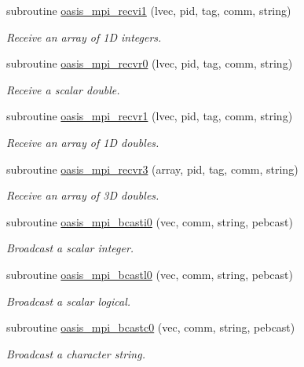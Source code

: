 \begin{DoxyCompactItemize}
subroutine \hyperlink{classmod__oasis__mpi_acf13ea626ed09fe98123f23d0990879d}{oasis\+\_\+mpi\+\_\+recvi1} (lvec, pid, tag, comm, string)
\begin{DoxyCompactList}\small\item\em Receive an array of 1\+D integers. \end{DoxyCompactList}\item 
subroutine \hyperlink{classmod__oasis__mpi_a2578d560c80d608340b5a49b327642ba}{oasis\+\_\+mpi\+\_\+recvr0} (lvec, pid, tag, comm, string)
\begin{DoxyCompactList}\small\item\em Receive a scalar double. \end{DoxyCompactList}\item 
subroutine \hyperlink{classmod__oasis__mpi_a2bbd8de453167b4c73aa09c3c44c0ca8}{oasis\+\_\+mpi\+\_\+recvr1} (lvec, pid, tag, comm, string)
\begin{DoxyCompactList}\small\item\em Receive an array of 1\+D doubles. \end{DoxyCompactList}\item 
subroutine \hyperlink{classmod__oasis__mpi_a2c3b82d2346a69cd20be3d35c5e70be6}{oasis\+\_\+mpi\+\_\+recvr3} (array, pid, tag, comm, string)
\begin{DoxyCompactList}\small\item\em Receive an array of 3\+D doubles. \end{DoxyCompactList}\item 
subroutine \hyperlink{classmod__oasis__mpi_af8bc029a22d59f1188b7f8a1a2645c40}{oasis\+\_\+mpi\+\_\+bcasti0} (vec, comm, string, pebcast)
\begin{DoxyCompactList}\small\item\em Broadcast a scalar integer. \end{DoxyCompactList}\item 
subroutine \hyperlink{classmod__oasis__mpi_a1426590a36b24f1770381b9c35563cff}{oasis\+\_\+mpi\+\_\+bcastl0} (vec, comm, string, pebcast)
\begin{DoxyCompactList}\small\item\em Broadcast a scalar logical. \end{DoxyCompactList}\item 
subroutine \hyperlink{classmod__oasis__mpi_a6d10e1673748a91dc7ec955ef16d771a}{oasis\+\_\+mpi\+\_\+bcastc0} (vec, comm, string, pebcast)
\begin{DoxyCompactList}\small\item\em Broadcast a character string. \end{DoxyCompactList}\item 

\end{DoxyCompactItemize}
